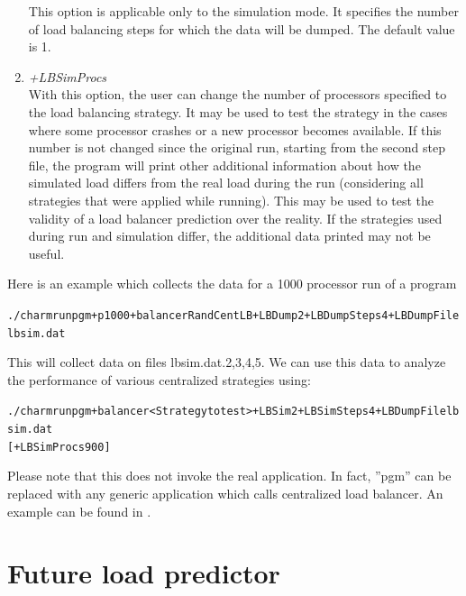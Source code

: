 \begin{enumerate}
        This option is applicable only to the simulation mode. It specifies the number of
  load balancing steps for which the data will be dumped. The default value is 1.
\item {\em +LBSimProcs}\\
        With this option, the user can change the number of processors
  specified to the load balancing strategy. It may be used to test
	the strategy in the cases where some processor crashes or a new processor becomes available. If this number is not
	changed since the original run, starting from the second step file, the program will print other additional
	information about how the simulated load differs from the real load during the run (considering all
	strategies that were applied while running). This may be used to test the validity of a load balancer
	prediction over the reality. If the strategies used during run and simulation differ, the additional data
	printed may not be useful.
\end{enumerate}
Here is an example which collects the data for a 1000 processor run of a program
\begin{alltt}
./charmrun pgm +p1000 +balancer RandCentLB +LBDump 2 +LBDumpSteps 4 +LBDumpFile lbsim.dat
\end{alltt}
This will collect data on files lbsim.dat.{2,3,4,5}. We can use this data to
analyze the performance of various centralized strategies using:
\begin{alltt}
./charmrun pgm +balancer <Strategy to test> +LBSim 2 +LBSimSteps 4 +LBDumpFile lbsim.dat
[+LBSimProcs 900]
\end{alltt}
Please note that this does not invoke the real application. In fact,
 ''pgm'' can be replaced with any generic application which calls centralized load balancer.
An example can be found in .

\section{Future load predictor}

